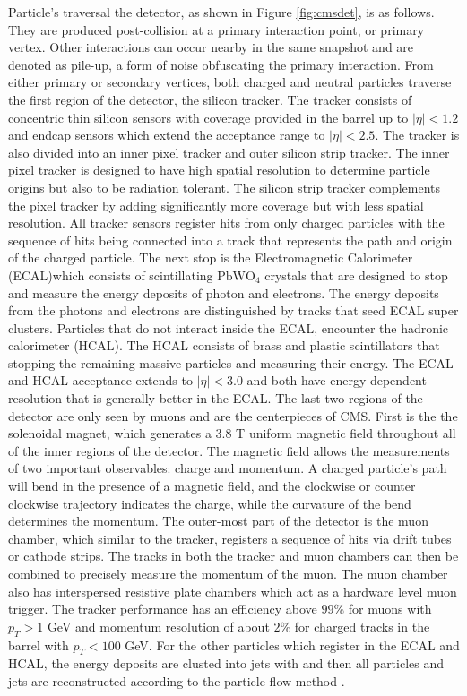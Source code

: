 Particle's traversal the detector, as shown in Figure \ref{fig:cmsdet}, is as follows. They are produced post-collision at a primary interaction point, or primary vertex. Other interactions can occur nearby in the same snapshot and are denoted as pile-up, a form of noise obfuscating the primary interaction. From either primary or secondary vertices, both charged and neutral particles traverse the first region of the detector, the silicon tracker. The tracker consists of concentric thin silicon sensors with coverage provided in the barrel up to $|\eta|<1.2$ and endcap sensors which extend the acceptance range to $|\eta| < 2.5$. The tracker is also divided into an inner pixel tracker and outer silicon strip tracker. The inner pixel tracker is designed to have high spatial resolution to determine particle origins but also to be radiation tolerant. The silicon strip tracker complements the pixel tracker by adding significantly more coverage but with less spatial resolution. All tracker sensors  register hits from only charged particles with the sequence of hits being connected into a track that represents the path and origin of the charged particle.  The next stop is the Electromagnetic Calorimeter (ECAL)which consists of scintillating $\text{PbWO}_4$ crystals that are designed to stop and measure the energy deposits of photon and electrons. The energy deposits from the photons and electrons are distinguished by tracks that seed ECAL super clusters. Particles that do not interact inside the ECAL, encounter the hadronic calorimeter (HCAL). The HCAL consists of brass and plastic scintillators that stopping the remaining massive particles and measuring their energy. The ECAL and HCAL acceptance extends to $|\eta| <3.0$ and both have energy dependent resolution that is generally better in the ECAL. The last two regions of the detector are only seen by muons and are the centerpieces of CMS. First is the the solenoidal magnet, which generates a 3.8 T uniform magnetic field throughout all of the inner regions of the detector. The magnetic field allows the measurements of two important observables: charge and momentum.  A charged particle's path will bend in the presence of a magnetic field, and the clockwise or counter clockwise trajectory indicates the charge, while the curvature of the bend determines the momentum. The outer-most part of the detector is the muon chamber, which similar to the tracker, registers a sequence of hits via drift tubes or cathode strips. The tracks in both the tracker and muon chambers can then be combined to precisely measure the momentum of the muon. The muon chamber also has interspersed resistive plate chambers which act as a hardware level muon trigger. The tracker performance has an efficiency above $99\%$ for muons with $p_T > 1$ GeV and momentum resolution of about $2\%$ for charged tracks in the barrel with $p_T < 100$ GeV. For the other particles which register in the ECAL and HCAL, the energy deposits are clusted into jets with and then all particles and jets are reconstructed according to the particle flow method \cite{CMS:2017yfk}. \cite{CMS:2008xjf} \cite{CMS:2017lum}

